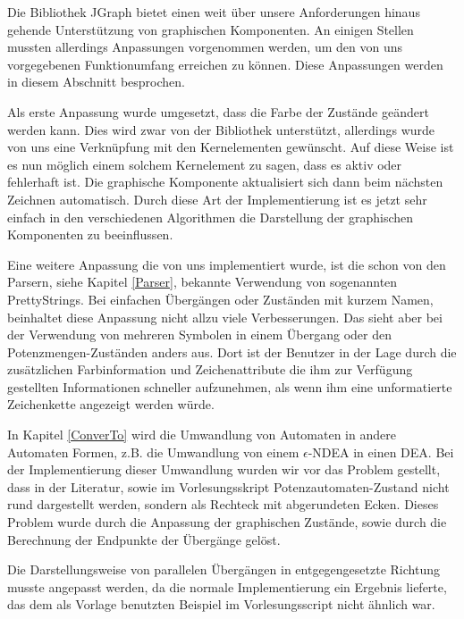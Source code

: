 Die Bibliothek JGraph bietet einen weit über unsere Anforderungen hinaus
gehende Unterstützung von graphischen Komponenten. An einigen Stellen mussten
allerdings Anpassungen vorgenommen werden, um den von uns vorgegebenen
Funktionumfang erreichen zu können. Diese Anpassungen werden in diesem
Abschnitt besprochen.\vspace{10pt}

Als erste Anpassung wurde umgesetzt, dass die Farbe der Zustände geändert
werden kann. Dies wird zwar von der Bibliothek unterstützt, allerdings wurde
von uns eine Verknüpfung mit den Kernelementen gewünscht. Auf diese Weise ist
es nun möglich einem solchem Kernelement zu sagen, dass es aktiv oder
fehlerhaft ist. Die graphische Komponente aktualisiert sich dann beim nächsten
Zeichnen automatisch. Durch diese Art der Implementierung ist es jetzt sehr
einfach in den verschiedenen Algorithmen die Darstellung der graphischen
Komponenten zu beeinflussen.\vspace{10pt}

Eine weitere Anpassung die von uns implementiert wurde, ist die schon von den
Parsern, siehe Kapitel \ref{Parser}, bekannte Verwendung von sogenannten
PrettyStrings. Bei einfachen Übergängen oder Zuständen mit kurzem Namen,
beinhaltet diese Anpassung nicht allzu viele Verbesserungen. Das sieht aber bei
der Verwendung von mehreren Symbolen in einem Übergang oder den
Potenzmengen-Zuständen anders aus. Dort ist der Benutzer in der Lage durch die
zusätzlichen Farbinformation und Zeichenattribute die ihm zur Verfügung
gestellten Informationen schneller aufzunehmen, als wenn ihm eine unformatierte
Zeichenkette angezeigt werden würde.\vspace{10pt}

In Kapitel \ref{ConverTo} wird die Umwandlung von Automaten in andere Automaten
Formen, z.B. die Umwandlung von einem $\epsilon$-NDEA in einen DEA. Bei der
Implementierung dieser Umwandlung wurden wir vor das Problem gestellt, dass in
der Literatur, sowie im Vorlesungsskript Potenzautomaten-Zustand nicht rund
dargestellt werden, sondern als Rechteck mit abgerundeten Ecken. Dieses Problem
wurde durch die Anpassung der graphischen Zustände, sowie durch die Berechnung
der Endpunkte der Übergänge gelöst.\vspace{10pt}

Die Darstellungsweise von parallelen Übergängen in entgegengesetzte Richtung
musste angepasst werden, da die normale Implementierung ein Ergebnis lieferte,
das dem als Vorlage benutzten Beispiel im Vorlesungsscript nicht ähnlich
war.\vspace{10pt}

